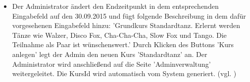 \documentclass[a4paper]{scrreprt}
\begin{document}
\begin{itemize}
\begin{itemize}
						\item Der Administrator ändert den Endzeitpunkt in dem entsprechenden Eingabefeld auf den 30.09.2015 und fügt folgende Beschreibung in dem dafür vorgesehenen Eingabefeld hinzu: 'Grundkurs Standardtanz. Erlernt werden Tänze wie Walzer, Disco Fox, Cha-Cha-Cha, Slow Fox und Tango. Die Teilnahme als Paar ist wünschenswert.' Durch Klicken des Buttons 'Kurs anlegen' legt der Admin den neuen Kurs 'Standardtanz' an. Der Administrator wird anschließend auf die Seite 'Adminverwaltung' weitergeleitet. Die KursId wird automatisch vom System generiert. (vgl. ) 		
				 
					\end{itemize}
				 			
			\end{itemize}			
								
\end{document}
